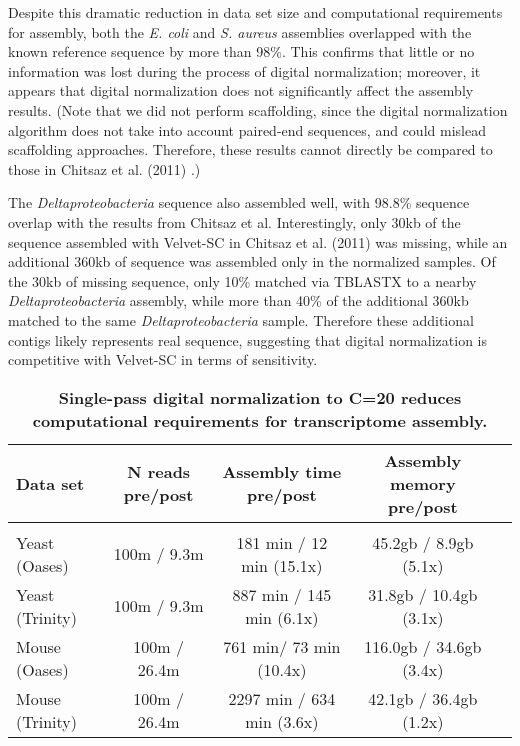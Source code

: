 %
Despite this dramatic reduction in data set size and computational requirements
for assembly, both the {\em E. coli} and {\em S. aureus} assemblies overlapped
with the known reference sequence by more than 98\%.  This confirms that little
or no information was lost during the process of digital normalization;
moreover, it appears that digital normalization does not significantly affect
the assembly results. (Note that we did not perform scaffolding, since the
digital normalization algorithm does not take into account paired-end
sequences, and could mislead scaffolding approaches.  Therefore, these results
cannot directly be compared to those in Chitsaz et al. (2011)
\cite{pubmed21926975}.)

The {\em Deltaproteobacteria} sequence also assembled well, with 98.8\%
sequence overlap with the results from Chitsaz et al. Interestingly, only 30kb
of the sequence assembled with Velvet-SC in Chitsaz et al. (2011) was missing,
while an additional 360kb of sequence was assembled only in the normalized
samples.  Of the 30kb of missing sequence, only 10\% matched via TBLASTX to a
nearby {\em Deltaproteobacteria} assembly, while more than 40\% of the
additional 360kb matched to the same {\em Deltaproteobacteria} sample.
Therefore these additional contigs likely represents real sequence, suggesting
that digital normalization is competitive with Velvet-SC in terms of
sensitivity.

% 


\begin{table}[!ht]
\small
\caption{
\bf{Single-pass digital normalization to C=20 reduces computational
requirements for transcriptome assembly.}}


\begin{tabular}{|l|c|c|c|c|}

Data set & N reads pre/post & Assembly time pre/post & Assembly memory pre/post \\
 \hline \\
Yeast (Oases) & 100m / 9.3m & 181 min / 12 min (15.1x) & 45.2gb / 8.9gb (5.1x) \\
Yeast (Trinity) & 100m / 9.3m & 887 min / 145 min (6.1x) & 31.8gb / 10.4gb (3.1x) \\
Mouse (Oases) & 100m / 26.4m & 761 min/ 73 min (10.4x) & 116.0gb / 34.6gb (3.4x) \\
Mouse (Trinity) & 100m / 26.4m & 2297 min / 634 min (3.6x) & 42.1gb / 36.4gb (1.2x) \\
\end{tabular}

\begin{flushleft}
\end{flushleft}
\label{tab:dntrans}
\end{table}


